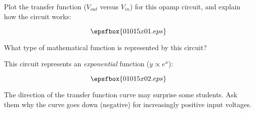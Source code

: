 

Plot the transfer function ($V_{out}$ versus $V_{in}$) for this opamp circuit, and explain how the circuit works:

$$\epsfbox{01015x01.eps}$$

What type of mathematical function is represented by this circuit?







This circuit represents an {\it exponential} function ($y \propto e^x$):

$$\epsfbox{01015x02.eps}$$







The direction of the transfer function curve may surprise some students.  Ask them why the curve goes down (negative) for increasingly positive input voltages.




